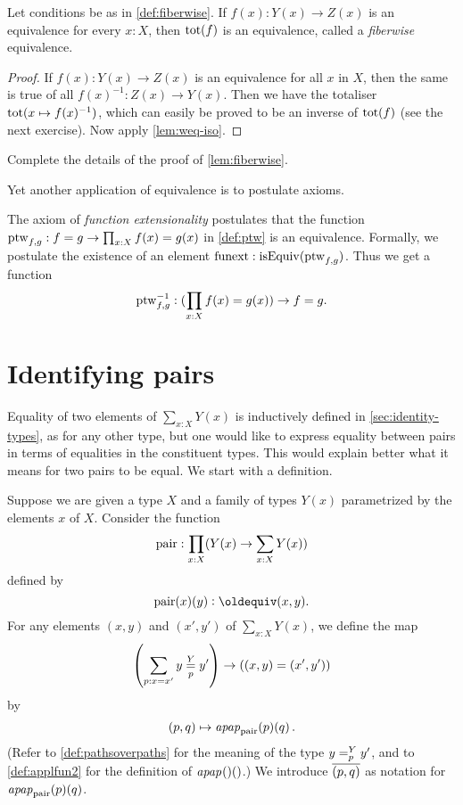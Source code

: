 \begin{lemma}\label{lem:fiberwise}
Let conditions be as in \cref{def:fiberwise}.
If $f(x): Y(x) \to Z(x)$ is an equivalence for every $x:X$,
then $\mathop{\mathrm{tot}}(f)$ is an equivalence,
called a \emph{fiberwise} equivalence.
\end{lemma}

\begin{proof}
If $f(x): Y(x) \to Z(x)$ is an equivalence for all $x$ in $X$,
then the same is true of all $f(x)^{-1}: Z(x) \to Y(x)$.
Then we have the totaliser $\mathop{\mathrm{tot}}(x\mapsto f(x)^{-1})$,
which can easily be proved to be an inverse of $\mathop{\mathrm{tot}}(f)$
(see the next exercise). Now apply \cref{lem:weq-iso}.
\end{proof}

\begin{xca}\label{xca:fiberwise}
Complete the details of the proof of \cref{lem:fiberwise}.
\end{xca}

Yet another application of  equivalence is to postulate axioms.

\begin{definition}\label{def:funext}
The axiom of \emph{function extensionality} postulates that the function
$\mathop{\mathrm{ptw}}_{f,g}: f=g \to \prod_{x:X} f(x)=g(x)$ in \cref{def:ptw} is an equivalence.
Formally, we postulate the existence of an element $\mathop{\mathrm{funext}} : \mathrm{isEquiv}(\mathop{\mathrm{ptw}}_{f,g})$.
Thus we get a function 
\[{\mathop{\mathrm{ptw}}}^{-1}_{f,g}: (\prod_{x:X} f(x)=g(x)) \to f=g.\]
\end{definition}


\section{Identifying pairs}\label{sec:pairpaths}

Equality of two elements of $\sum _{x:X} Y(x)$ is inductively defined in \cref{sec:identity-types}, as for any other type, but
one would like to express equality between pairs in terms of equalities in the constituent types.  This would explain better what it means for
two pairs to be equal.  We start with a definition.

\begin{definition}\label{def:pairtopath}
  Suppose we are given a type $X$ and a family of types $Y(x)$ parametrized by the elements $x$ of $X$.
  Consider the function $$\mathop{\mathrm{pair}} : \prod_{x:X} ( Y(x) \to \sum _{x:X} Y(x) ) $$ defined by $$ \pair(x)(y) \defeq (x,y). $$
  For any elements $(x,y)$ and $(x',y')$ of $\sum _{x:X} Y(x)$, we define the map 
  $$\left( \sum_{p:x=x'} {y} \overset{Y}{\underset{p}=} y' \right) \to \left ( (x,y) = (x',y') \right )$$
  by $$ (p,q) \mapsto \mathop{{\it apap}_{\mathop{\mathrm{pair}}}(p)(q)}. $$
  (Refer to \cref{def:pathsoverpaths} for the meaning of the type $y =^{Y}_{p} y'$, and to \cref{def:applfun2} for the definition of $\mathop{{\it apap}_{}()()}$.)
  We introduce $\overline{({p},{q})}$ as notation for $\mathop{{\it apap}_{\mathop{\mathrm{pair}}}(p)(q)}$.
\end{definition}

